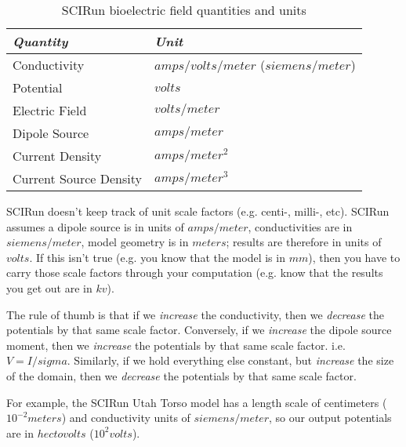 \begin{table}[htbp]
 \begin{center}
  \begin{tabular}{|l|l|}
   \hline
   {\em Quantity}&{\em Unit} \\
   \hline
   Conductivity&$amps / volts / meter$  ($siemens / meter$) \\
   Potential&$volts$ \\
   Electric Field&$volts / meter$ \\
   Dipole Source&$amps / meter$ \\
   Current Density&$amps / meter^2$ \\
   Current Source Density&$amps / meter^3$ \\
   \hline
  \end{tabular}
  \caption{SCIRun bioelectric field quantities and units}
  \label{tbl:units}
 \end{center}
\end{table}

SCIRun doesn't keep track of unit scale factors (e.g. centi-, milli-,
etc).  SCIRun assumes a dipole source is in units of $amps / meter$,
conductivities are in $siemens / meter$, model geometry is in $meters$;
results are therefore in units of $volts$.  If this isn't true (e.g. you
know that the model is in $mm$), then you have to carry those scale
factors through your computation (e.g. know that the results you get out
are in $kv$).

The rule of thumb is that if we \emph{increase} the conductivity, then
we \emph{decrease} the potentials by that same scale factor.
Conversely, if we \emph{increase} the dipole source moment, then we
\emph{increase} the potentials by that same scale factor.  i.e. $V = I /
sigma$.  Similarly, if we hold everything else constant, but
\emph{increase} the size of the domain, then we \emph{decrease} the
potentials by that same scale factor.

For example, the SCIRun Utah Torso model has a length scale of
centimeters ($10^{-2} meters$) and conductivity units of $siemens /
meter$, so our output potentials are in $hectovolts$  ($10^2 volts$).

